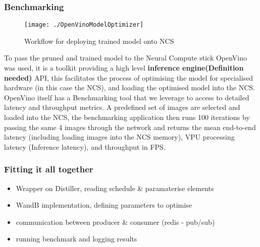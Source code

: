 \documentclass[../Dissertation.tex]{subfiles}
\begin{document}
\subsubsection{Benchmarking}

\begin{figure}[H]
	\centering
	\texttt{[image: ./OpenVinoModelOptimizer]}
	\caption{Workflow for deploying trained model onto NCS \autocite{ModelOptimizerDeveloper}}
	\label{fig:OpenVinoWorkflow}
\end{figure}


To pass the pruned and trained model to the Neural Compute stick OpenVino was used, it is a toolkit providing a high level \textbf{inference engine(Definition needed)} API, this facilitates the process of optimising the model for specialised hardware (in this case the NCS), and loading the optimised model into the NCS. 
OpenVino itself has a Benchmarking tool that we leverage to access to detailed latency and throughput metrics. A predefined set of images are selected and loaded into the NCS, the benchmarking application then runs 100 iterations by passing the same 4 images through the network and returns the mean end-to-end latency (including loading images into the NCS memory), VPU processing latency (Inference latency), and throughput in FPS.

\subsubsection{Fitting it all together}
\begin{itemize}
    \item Wrapper on Distiller, reading schedule \& paramaterise elements
    \item WandB implementation, defining parameters to optimise
    \item communication between producer \& consumer (redis - pub/sub)
    \item running benchmark and logging results
\end{itemize}
\end{document}
